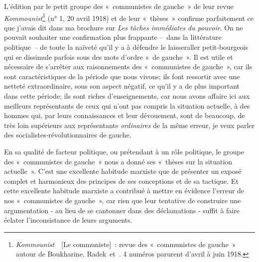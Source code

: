 \documentclass[french,twoside]{book} %
\begin{document}
  \noindent L’édition par le petit groupe des « communistes de gauche » de leur revue \emph{Kommounist}\footnote{\emph{Kommounist}  [Le communiste] : revue des « communistes de gauche » autour de Boukharine, Radek et \href{https://www.marxists.org/francais/bios/piatakov.htm}{}. 4 numéros parurent d’avril à juin 1918.} (n° 1, 20 avril 1918) et de leur « thèses » confirme parfaitement ce que j’avais dit dans ma brochure sur \emph{Les tâches immédiates du pouvoir}. On ne pouvait souhaiter une confirmation plus frappante – dans la littérature politique – de toute la naïveté qu’il y a à défendre le laisser­aller petit‑bourgeois qui se dissimule parfois sous des mots d’ordre « de gauche ». Il est utile et nécessaire de s’arrêter aux raisonnements des « communistes de gauche », car ils sont caractéristiques de la période que nous vivons; ils font ressortir avec une netteté extraordinaire, sous son aspect négatif, ce qu’il y a de plus important dans cette période; ils sont riches d’enseignements, car nous avons affaire ici aux meilleurs représentants de ceux qui n’ont pas compris la situation actuelle, à des hommes qui, par leurs connaissances et leur dévouement, sont de beaucoup, de très loin supérieurs aux représentants \emph{ordinaires} de la même erreur, je veux parler des socialistes‑révolutionnaires de gauche.\par
En sa qualité de facteur politique, ou prétendant à un rôle politique, le groupe des « communistes de gauche » nous a donné ses « thèses sur la situation actuelle ». C’est une excellente habitude marxiste que de présenter un exposé complet et harmonieux des principes de ses conceptions et de sa tactique. Et cette excellente habitude marxiste a contribué à mettre en évidence l’erreur de nos \hspace{1em}« communistes de gauche », car rien que leur tentative de construire une argumentation ‑ au lieu de se cantonner dans des déclamations ‑ suffit à faire éclater l’inconsistance de leurs arguments.\par
\end{document}
